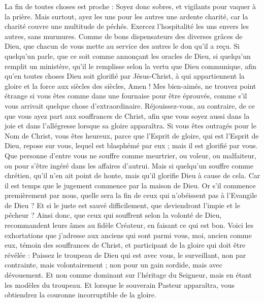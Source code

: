 \begin{multicols}{2}
La fin de toutes choses est proche : Soyez donc sobres, et vigilants pour vaquer à la prière.
Mais surtout, ayez les uns pour les autres une ardente charité, car la charité couvre une multitude de péchés.
Exercez l'hospitalité les uns envers les autres, sans murmures.
Comme de bons dispensateurs des diverses grâces de Dieu, que chacun de vous mette au service des autres le don qu'il a reçu.
Si quelqu'un parle, que ce soit comme annonçant les oracles de Dieu, si quelqu'un remplit un ministère, qu'il le remplisse selon la vertu que Dieu communique, afin qu'en toutes choses Dieu soit glorifié par Jésus-Christ, à qui appartiennent la gloire et la force aux siècles des siècles, Amen !
Mes bien-aimés, ne trouvez point étrange si vous êtes comme dans une fournaise pour être éprouvés, comme s'il vous arrivait quelque chose d'extraordinaire.
Réjouissez-vous, au contraire, de ce que vous ayez part aux souffrances de Christ, afin que vous soyez aussi dans la joie et dans l'allégresse lorsque sa gloire apparaîtra.
Si vous êtes outragés pour le Nom de Christ, vous êtes heureux, parce que l'Esprit de gloire, qui est l'Esprit de Dieu, repose sur vous, lequel est blasphémé par eux ; mais il est glorifié par vous.
Que personne d'entre vous ne souffre comme meurtrier, ou voleur, ou malfaiteur, ou pour s'être ingéré dans les affaires d'autrui.
Mais si quelqu'un souffre comme chrétien, qu'il n'en ait point de honte, mais qu'il glorifie Dieu à cause de cela.
Car il est temps que le jugement commence par la maison de Dieu. Or s'il commence premièrement par nous, quelle sera la fin de ceux qui n'obéissent pas à l'Evangile de Dieu ?
Et si le juste est sauvé difficilement, que deviendront l'impie et le pécheur ?
Ainsi donc, que ceux qui souffrent selon la volonté de Dieu, recommandent leurs âmes au fidèle Créateur, en faisant ce qui est bon.
\VerseOne{}Voici les exhortations que j'adresse aux anciens qui sont parmi vous, moi, ancien comme eux, témoin des souffrances de Christ, et participant de la gloire qui doit être révélée :
Paissez le troupeau de Dieu qui est avec vous, le surveillant, non par contrainte, mais volontairement ; non pour un gain sordide, mais avec dévouement.
Et non comme dominant sur l'héritage du Seigneur, mais en étant les modèles du troupeau.
Et lorsque le souverain Pasteur apparaîtra, vous obtiendrez la couronne incorruptible de la gloire.

\end{multicols}
